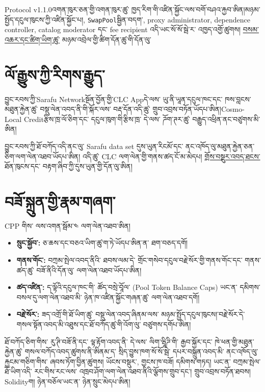 \documentclass[11pt]{article}
\begin{document}
Protocol v1.1.0འགན་ཁུར་ཅན་གྱི་འགན་ཁུར་ཚུ་ ཁྱད་རིག་གི་འཛིན་སྐྱོང་ལས་བགོ་བཤའ་རྐྱབ་ཨིན།མཉམ་སྤྱོད་དངུལ་ཁུངས་ཀྱི་འཛིན་སྐྱོང་པ།, \texttt{SwapPool}སྦྱིན་བདག་, proxy administrator, dependence controller, catalog moderator དང་ fee recipient འདི་ཡང་སོ་སོ་སྦེ་ར་ འཁྱད་འགྱོ་ཚུགས། \href{https://docs.cosmolocal.credit/dz/introduction/concepts}{བསམ་འཆར་དང་ཚིག་ཡིག་ཚུ་} མཉམ་འབྲེལ་གྱི་ཚིག་དོན་ཚུ་གི་དོན་ལུ་

\section*{ལོ་རྒྱུས་ཀྱི་རིགས་རྒྱུད་}

བྱུང་རབས་ཀྱི་Sarafu Networkསྔོན་བྱོན་གྱི་CLC Appདེ་ལས་ ཡུ་ནི་ཡཱན་དངུལ་ཁང་དང་ ཁས་བླངས་མཐུན་རྐྱེན་ཚུ་ བསྡུ་ལེན་འབད་ནི་གི་སྐོར་ལས་ བརྡ་དོན་འདི་ཚུ་ གྲུབ་འབྲས་བཏོན་ཡོདཔ་ཨིན།Cosmo-Local Creditརྩིས་ཁྲ་ལོ་ཅིག་དང་ དངུལ་ཁུག་གི་རྩིས་ཁྲ་ དེ་ལས་ ཌོག་ཊར་ཚུ་ བརྒྱུད་འཕྲིན་ནང་བཙུགས་མི་ཨིན།

བྱུང་རབས་ཀྱི་ཐོ་བཀོད་འདི་ནང་ལུ་ Sarafu data set དུས་ཡུན་རིངམོ་དང་ ནང་འཁོད་ལུ་མཐུན་རྐྱེན་ཅན་ཅིག་ལག་ལེན་འཐབ་ཡོདཔ་ཨིན། འདི་ཚུ་ CLC ལག་ལེན་གྱི་གནས་ཚད་ངོ་མ་མེདཔ། \href{https://docs.cosmolocal.credit/dz/white-paper/executive-summary}{གྲོས་བསྡུར་འབད་ཐངས་} ཐོན་ཁུངས་དང་ བརྟག་ཞིབ་ཀྱི་དུས་ཡུན་གྱི་དོན་ལུ་ཨིན།

\section*{བཟོ་སྐྲུན་གྱི་རྣམ་གཞག་}

CPP གིས་ ལས་འགན་སྦོམ་༤ ལག་ལེན་འཐབ་ཨིན།

\begin{itemize}[leftmargin=*]
\item \textbf{སྲུང་སྐྱོབ་:} ཅ་ཆས་དང་བཅའ་ཡིག་ཚུ་ག་ཏེ་ཡོདཔ་ཨིན་ན་ ཐག་བཅད་དགོ།
\item \textbf{གནས་གོང་:} བཀྲམ་སྤེལ་འབད་ནིའི་ ཐབས་ལམ་དེ་ གྲོང་གསེབ་དངུལ་བརྗེ་སོར་གྱི་གནས་གོང་དང་ གནས་ཚད་ཚུ་ བཟོ་ནིའི་དོན་ལུ་ ལག་ལེན་འཐབ་ཡོདཔ་ཨིན།
\item \textbf{ཚད་འཛིན་:} ད་ལྟོའི་དངུལ་ཁང་གི་ ཚོད་བསྲེ་བཱོལ་ (Pool Token Balance Caps) ཡང་ན་ དམིགས་བསལ་དུ་ལག་ལེན་འཐབ་མི་ ཉེན་ཁ་འཛིན་སྐྱོང་གཞན་ཚུ་ ལག་ལེན་འཐབ་དགོ།
\item \textbf{བརྗེ་སོར་:} ཟད་འགྲོ་གི་ཐོ་ཡིག་ཚུ་ བསྡུ་ལེན་འབད་ཞིནམ་ལས་ མཉམ་སྤྱོད་དངུལ་ཁུངས།་བརྗེ་སོར་དེ་ གསལ་སྟོན་འབད་མི་འཐུས་དང་ཐོ་བཀོད་ཚུ་གི་འོག་ལུ་ བཙུགས་དགོཔ་ཨིན།
\end{itemize}
ཐོ་བཀོད་ཅིག་གིས་ རུ་ཊི་བཟོ་ནི་དང་ ལྟ་རྟོག་འབད་ནི་ དེ་ལས་ ལིག་ཝཱིཌི་གི་ རྒྱབ་སྐྱོར་དང་ ཁེ་ཕན་གྱི་མཐུན་རྐྱེན་ཚུ་ གསལ་བཀོད་འབད་ཚུགས་ནི་ཨིནམ་ད་ སྲིད་བྱུས་ཁག་སོ་སོ་སྦེ་ དཔར་བསྐྲུན་འབད་མི་ ནང་འཁོད་ལུ་རྐྱངམ་གཅིག་གིས་ ཞབས་ཏོག་བྱིན་ཚུགས། ཡོངས་བསྡུར་, གྱངས་ཁ་བཟོ། དམིགས་གཏད། ཡང་ན་ བཀྲམ་སྤེལ་ཐོ་ཡིག་འདི་ རང་གིས་རང་ལས་ འཁྲབ་ཤོག་ལག་ལེན་འཐབ་ནིའི་ལྕོགས་གྲུབ་དང་། གྲུབ་འབྲས་བཏོན་ཐབས། Solidityག། ཉེན་བཅོལ་ཡང་ན་ ཉེན་སྲུང་མེདཔ་ཨིན།
\end{document}

